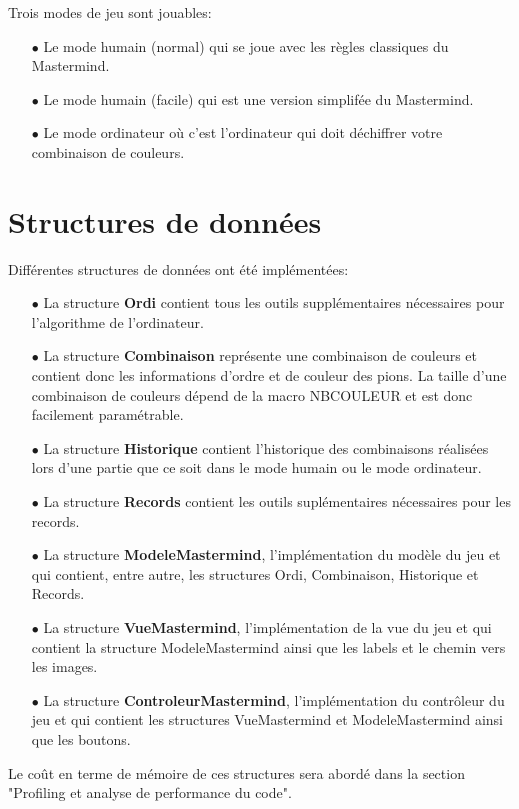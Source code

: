 \documentclass[a4paper, 11pt, oneside]{article}
\begin{document}
Trois modes de jeu sont jouables:
\begin{itemize}
    \item[$\bullet$] Le mode humain (normal) qui se joue avec les règles classiques du Mastermind.
    \item[$\bullet$] Le mode humain (facile) qui est une version simplifée du Mastermind.
    \item[$\bullet$] Le mode ordinateur où c'est l'ordinateur qui doit déchiffrer votre combinaison de couleurs.
\end{itemize}

\section{Structures de données}
Différentes structures de données ont été implémentées:
\begin{itemize}
    \item[$\bullet$] La structure \textbf{Ordi} contient tous les outils supplémentaires nécessaires pour l'algorithme de l'ordinateur.
    \item[$\bullet$] La structure \textbf{Combinaison} représente une combinaison de couleurs et contient donc les informations d'ordre et de couleur des pions. La taille d'une combinaison de couleurs dépend de la macro NB\textunderscore COULEUR et est donc facilement paramétrable.
    \item[$\bullet$] La structure \textbf{Historique} contient l'historique des combinaisons réalisées lors d'une partie que ce soit dans le mode humain ou le mode ordinateur.
    \item[$\bullet$] La structure \textbf{Records} contient les outils suplémentaires nécessaires pour les records.
    \item[$\bullet$] La structure \textbf{ModeleMastermind}, l'implémentation du modèle du jeu et qui contient, entre autre, les structures Ordi, Combinaison, Historique et Records.
    \item[$\bullet$] La structure \textbf{VueMastermind}, l'implémentation de la vue du jeu et qui contient la structure ModeleMastermind ainsi que les labels et le chemin vers les images.
    \item[$\bullet$] La structure \textbf{ControleurMastermind}, l'implémentation du contrôleur du jeu et qui contient les structures VueMastermind et ModeleMastermind ainsi que les boutons. 
\end{itemize}
Le coût en terme de mémoire de ces structures sera abordé dans la section "Profiling et analyse de performance du code".
\end{document}
